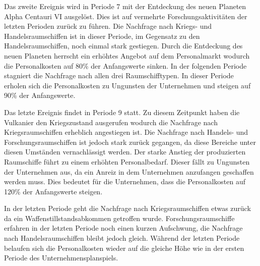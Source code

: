 Das zweite Ereignis wird in Periode 7 mit der Entdeckung des neuen Planeten Alpha Centauri VI ausgelöst. Dies ist auf vermehrte Forschungsaktivitäten der letzten Perioden zurück zu führen. Die Nachfrage nach Kriegs- und Handelsraumschiffen ist in dieser Periode, im Gegensatz zu den Handelsraumschiffen, noch einmal stark gestiegen. Durch die Entdeckung des neuen Planeten herrscht ein erhöhtes Angebot auf dem Personalmarkt wodurch die Personalkosten auf 80\% der Anfangswerte sinken. In der folgenden Periode stagniert die Nachfrage nach allen drei Raumschifftypen. In dieser Periode erholen sich die Personalkosten zu Ungunsten der Unternehmen und steigen auf 90\% der Anfangswerte. 

Das letzte Ereignis findet in Periode 9 statt. Zu diesem Zeitpunkt haben die Vulkanier den Kriegszustand ausgerufen wodurch die Nachfrage nach Kriegsraumschiffen erheblich angestiegen ist. Die Nachfrage nach Handels- und Forschungsraumschiffen ist jedoch stark zurück gegangen, da diese Bereiche unter diesen Umständen vernachlässigt werden. Der starke Anstieg der produzierten Raumschiffe führt zu einem erhöhten Personalbedarf. Dieser fällt zu Ungunsten der Unternehmen aus, da ein Anreiz in dem Unternehmen anzufangen geschaffen werden muss. Dies bedeutet für die Unternehmen, dass die Personalkosten auf 120\% der Anfangswerte steigen. 

In der letzten Periode geht die Nachfrage nach Kriegsraumschiffen etwas zurück da ein Waffenstillstandsabkommen getroffen wurde. Forschungsraumschiffe erfahren in der letzten Periode noch einen kurzen Aufschwung, die Nachfrage nach Handelsraumschiffen bleibt jedoch gleich. Während der letzten Periode belaufen sich die Personalkosten wieder auf die gleiche Höhe wie in der ersten Periode des Unternehmensplanspiels. 

\autorende{}